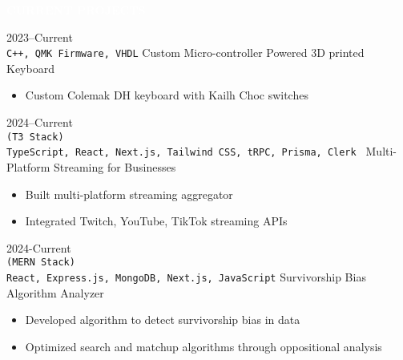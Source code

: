 \documentclass[9pt]{src/developercv} %
\begin{document}

\colorbox{sky700}{\textcolor{white}{\LARGE\MakeUppercase{\textbf{Current Projects}}}}\\%
\begin{entrylist}
	\entry
		{2023--Current\\
		\small{\texttt{C++, QMK Firmware, VHDL}}}
		{Custom Micro-controller Powered 3D printed Keyboard}
		{}
		{
			\vspace{-1.0\baselineskip}
			\begin{itemize}
				\item Custom Colemak DH keyboard with Kailh Choc switches
			\end{itemize}
		}
	\entry
		{2024--Current\\
		\small{\texttt{(T3 Stack)\\TypeScript, React, Next.js, Tailwind CSS, tRPC, Prisma, Clerk }}}
		{Multi-Platform Streaming for Businesses}
		{}
		{
			\vspace{-1.0\baselineskip}
			\begin{itemize}
				\item Built multi-platform streaming aggregator
				\item Integrated Twitch, YouTube, TikTok streaming APIs
			\end{itemize}
		}
	\entry
		{2024-Current\\
		\small{\texttt{(MERN Stack)\\React, Express.js, MongoDB, Next.js, JavaScript}}}
		{Survivorship Bias Algorithm Analyzer}
		{}
		{
			\vspace{-1.0\baselineskip}
			\begin{itemize}
				\item Developed algorithm to detect survivorship bias in data
				\item Optimized search and matchup algorithms through oppositional analysis
			\end{itemize}
		}
\end{entrylist}
\end{document}
